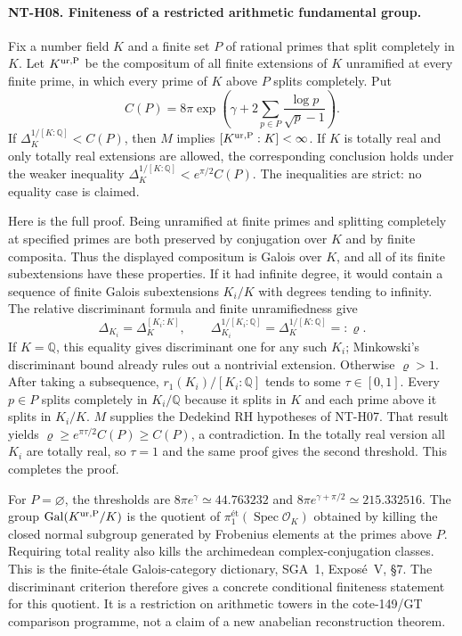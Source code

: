 \paragraph{NT-H08. Finiteness of a restricted arithmetic fundamental group.}
Fix a number field $K$ and a finite set $P$ of rational primes that
split completely in $K$.  Let $K^{\rm ur,P}$ be the compositum of all
finite extensions of $K$ unramified at every finite prime, in which
every prime of $K$ above $P$ splits completely.  Put
\[
 C(P)=8\pi\exp\left(\gamma+
                 2\sum_{p\in P}\frac{\log p}{\sqrt p-1}\right).
\]
If $\Delta_K^{1/[K:\mathbb Q]}<C(P)$, then $M$ implies
$[K^{\rm ur,P}:K]<\infty$.
If $K$ is totally real and only totally real extensions are allowed,
the corresponding conclusion holds under the weaker inequality
$\Delta_K^{1/[K:\mathbb Q]}<e^{\pi/2}C(P)$.
The inequalities are strict: no equality case is claimed.

Here is the full proof.  Being unramified at finite primes and splitting
completely at specified primes are both preserved by conjugation over
$K$ and by finite composita.  Thus the displayed compositum is Galois
over $K$, and all of its finite subextensions have these properties.
If it had infinite degree, it would contain a sequence of finite
Galois subextensions $K_i/K$ with degrees tending to infinity.
The relative discriminant formula and finite unramifiedness give
\[
 \Delta_{K_i}=\Delta_K^{[K_i:K]},\qquad
 \Delta_{K_i}^{1/[K_i:\mathbb Q]}=
                  \Delta_K^{1/[K:\mathbb Q]}=: \varrho.
\]
If $K=\mathbb Q$, this equality gives discriminant one for any such
$K_i$; Minkowski's discriminant bound already rules out a nontrivial
extension.  Otherwise $\varrho>1$.
After taking a subsequence, $r_1(K_i)/[K_i:\mathbb Q]$ tends to some
$\tau\in[0,1]$.  Every $p\in P$ splits completely in $K_i/\mathbb Q$
because it splits in $K$ and each prime above it splits in $K_i/K$.
$M$ supplies the Dedekind RH hypotheses of NT-H07.  That result yields
$\varrho\ge e^{\pi\tau/2}C(P)\ge C(P)$, a contradiction.
In the totally real version all $K_i$ are totally real, so $\tau=1$
and the same proof gives the second threshold.  This completes the proof.

For $P=\varnothing$, the thresholds are
$8\pi e^\gamma\simeq44.763232$ and
$8\pi e^{\gamma+\pi/2}\simeq215.332516$.
The group $\operatorname{Gal}(K^{\rm ur,P}/K)$ is the quotient of
$\pi_1^{\text{ét}}(\operatorname{Spec}\mathcal O_K)$ obtained by
killing the closed normal subgroup generated by Frobenius elements at
the primes above $P$.  Requiring total reality also kills the
archimedean complex-conjugation classes.  This is the finite-\'{e}tale
Galois-category dictionary, SGA~1, Expos\'e~V, \S7.  The discriminant
criterion therefore gives a concrete conditional finiteness statement
for this quotient.  It is a restriction on arithmetic towers in the
cote-149/GT comparison programme, not a claim of a new anabelian
reconstruction theorem.


